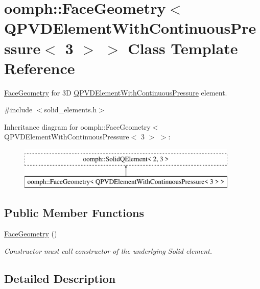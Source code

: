 \hypertarget{classoomph_1_1FaceGeometry_3_01QPVDElementWithContinuousPressure_3_013_01_4_01_4}{}\section{oomph\+:\+:Face\+Geometry$<$ Q\+P\+V\+D\+Element\+With\+Continuous\+Pressure$<$ 3 $>$ $>$ Class Template Reference}
\label{classoomph_1_1FaceGeometry_3_01QPVDElementWithContinuousPressure_3_013_01_4_01_4}


\hyperlink{classoomph_1_1FaceGeometry}{Face\+Geometry} for 3D \hyperlink{classoomph_1_1QPVDElementWithContinuousPressure}{Q\+P\+V\+D\+Element\+With\+Continuous\+Pressure} element.  




{\ttfamily \#include $<$solid\+\_\+elements.\+h$>$}

Inheritance diagram for oomph\+:\+:Face\+Geometry$<$ Q\+P\+V\+D\+Element\+With\+Continuous\+Pressure$<$ 3 $>$ $>$\+:\begin{figure}[H]
\begin{center}
\leavevmode
\includegraphics[height=2.000000cm]{classoomph_1_1FaceGeometry_3_01QPVDElementWithContinuousPressure_3_013_01_4_01_4}
\end{center}
\end{figure}
\subsection*{Public Member Functions}
\begin{DoxyCompactItemize}
\item 
\hyperlink{classoomph_1_1FaceGeometry_3_01QPVDElementWithContinuousPressure_3_013_01_4_01_4_aeab2d09c7a96416e52aae28818b1c0c4}{Face\+Geometry} ()
\begin{DoxyCompactList}\small\item\em Constructor must call constructor of the underlying Solid element. \end{DoxyCompactList}\end{DoxyCompactItemize}


\subsection{Detailed Description}
